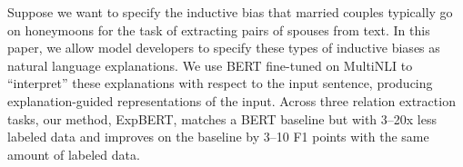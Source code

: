 Suppose we want to specify the inductive bias that married couples typically go on honeymoons for the task of extracting pairs of spouses from text.  In this paper, we allow model developers to specify these types of inductive biases as natural language explanations. We use BERT fine-tuned on MultiNLI to ``interpret'' these explanations with respect to the input sentence, producing explanation-guided representations of the input. Across three relation extraction tasks, our method, ExpBERT, matches a BERT baseline but with 3--20x less labeled data and improves on the baseline by 3--10 F1 points with the same amount of labeled data.
